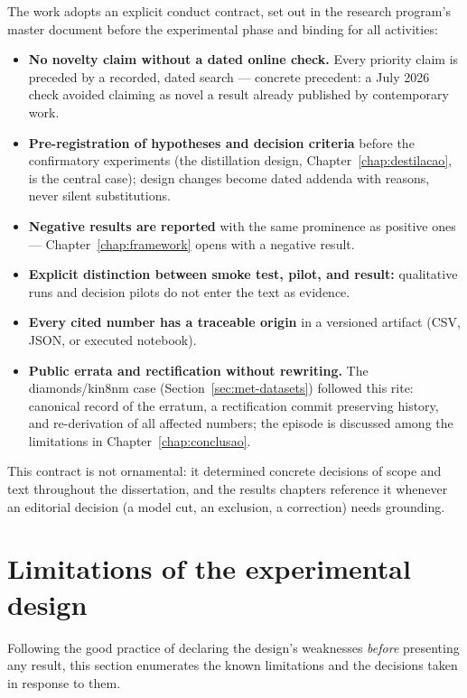 The work adopts an explicit conduct contract, set out in the
research program's master document before the experimental phase and
binding for all activities:

\begin{itemize}
  \item \textbf{No novelty claim without a dated online check.}
    Every priority claim is preceded by a recorded, dated search ---
    concrete precedent: a July 2026 check avoided claiming as novel
    a result already published by contemporary work.
  \item \textbf{Pre-registration of hypotheses and decision
    criteria} before the confirmatory experiments (the distillation
    design, Chapter~\ref{chap:destilacao}, is the central case);
    design changes become dated addenda with reasons, never silent
    substitutions.
  \item \textbf{Negative results are reported} with the same
    prominence as positive ones --- Chapter~\ref{chap:framework}
    opens with a negative result.
  \item \textbf{Explicit distinction between smoke test, pilot, and
    result:} qualitative runs and decision pilots do not enter the
    text as evidence.
  \item \textbf{Every cited number has a traceable origin} in a
    versioned artifact (CSV, JSON, or executed notebook).
  \item \textbf{Public errata and rectification without
    rewriting.} The diamonds/kin8nm case
    (Section~\ref{sec:met-datasets}) followed this rite: canonical
    record of the erratum, a rectification commit preserving
    history, and re-derivation of all affected numbers; the episode
    is discussed among the limitations in
    Chapter~\ref{chap:conclusao}.
\end{itemize}

This contract is not ornamental: it determined concrete decisions of
scope and text throughout the dissertation, and the results chapters
reference it whenever an editorial decision (a model cut, an
exclusion, a correction) needs grounding.

\section{Limitations of the experimental design}
\label{sec:met-limitacoes}

Following the good practice of declaring the design's weaknesses
\emph{before} presenting any result, this section enumerates the
known limitations and the decisions taken in response to them.

